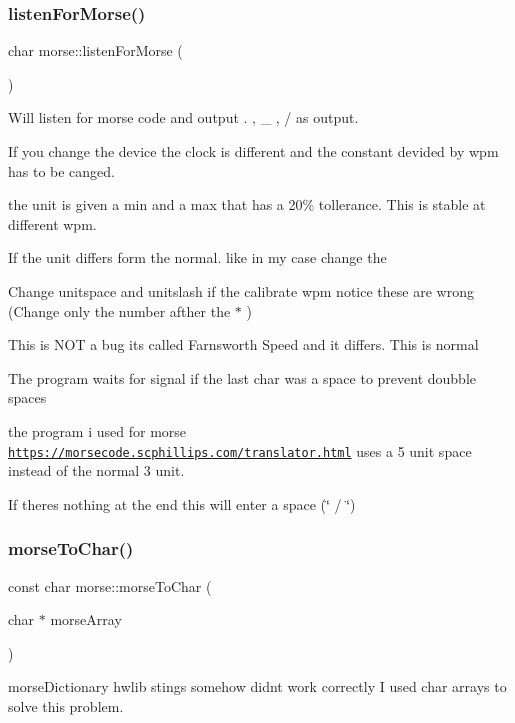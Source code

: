 \subsubsection{\texorpdfstring{listen\+For\+Morse()}{listenForMorse()}}
{\footnotesize\ttfamily char morse\+::listen\+For\+Morse (\begin{DoxyParamCaption}{ }\end{DoxyParamCaption})}



Will listen for morse code and output . , \+\_\+ , / as output. 

If you change the device the clock is different and the constant devided by wpm has to be canged.

the unit is given a min and a max that has a 20\% tollerance. This is stable at different wpm.

If the unit differs form the normal. like in my case change the

Change unitspace and unitslash if the calibrate wpm notice these are wrong (Change only the number afther the $\ast$ )

This is N\+OT a bug it\textquotesingle{}s called Farnsworth Speed and it differs. This is normal

The program waits for signal if the last char was a space to prevent doubble spaces

the program i used for morse \href{https://morsecode.scphillips.com/translator.html}{\tt https\+://morsecode.\+scphillips.\+com/translator.\+html} uses a 5 unit space instead of the normal 3 unit.

If theres nothing at the end this will enter a space (\char`\"{} / \char`\"{}) \mbox{\label{classmorse_a697d50fc8f58b68626cd5e80297cfde6}} 
\subsubsection{\texorpdfstring{morse\+To\+Char()}{morseToChar()}}
{\footnotesize\ttfamily const char morse\+::morse\+To\+Char (\begin{DoxyParamCaption}\item[{char $\ast$}]{morse\+Array }\end{DoxyParamCaption})}



morse\+Dictionary hwlib stings somehow didn\textquotesingle{}t work correctly I used char arrays to solve this problem. 

